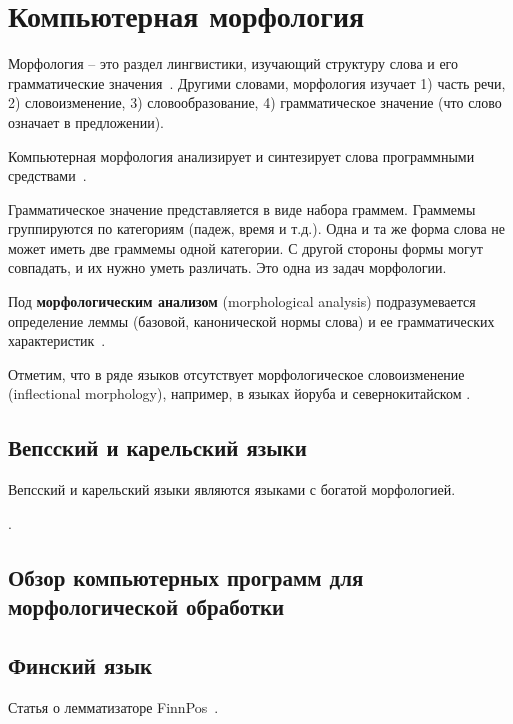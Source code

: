 \section{Компьютерная морфология}\label{sect_review_comp_morphology}

Морфология -- это раздел лингвистики, изучающий структуру слова и его грамматические значения~\cite{MitreninaNikolaevLando2016}. Другими словами, морфология изучает
1) часть речи,
2) словоизменение,
3) словообразование,
4) грамматическое значение (что слово означает в предложении). 

Компьютерная морфология анализирует и синтезирует слова программными средствами~\cite{MitreninaNikolaevLando2016}. 

Грамматическое значение представляется в виде набора граммем. 
Граммемы группируются по категориям (падеж, время и т.д.). 
Одна и та же форма слова не может иметь две граммемы одной категории. 
С другой стороны формы могут совпадать, и их нужно уметь различать. 
Это одна из задач морфологии.


Под \textbf{морфологическим анализом} (morphological analysis) 
подразумевается определение леммы (базовой, канонической нормы слова) и ее грамматических характеристик~\cite{MitreninaNikolaevLando2016}.

Отметим, что в ряде языков отсутствует морфологическое словоизменение (inflectional morphology), 
например, в языках йоруба и севернокитайском .


\subsection{Вепсский и карельский языки}\label{sect_review_veps_karelian}

Вепсский и карельский языки являются языками с богатой морфологией. 

\cite{silfverberg2016finnpos}.




\subsection{Обзор компьютерных программ для морфологической обработки}

\subsection{Финский язык}\label{sect_review_fin}

Статья о лемматизаторе FinnPos~\cite{silfverberg2016finnpos}.

